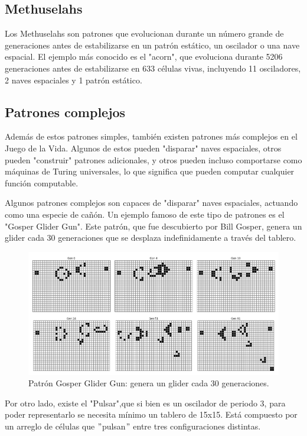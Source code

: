 \documentclass[]{article}
\begin{document}
\subsection{Methuselahs}
Los Methuselahs son patrones que evolucionan durante un número grande de generaciones antes de estabilizarse en un patrón estático, un oscilador o una nave espacial. El ejemplo más conocido es el "acorn", que evoluciona durante 5206 generaciones antes de estabilizarse en 633 células vivas, incluyendo 11 osciladores, 2 naves espaciales y 1 patrón estático.


\subsection{Patrones complejos}\label{sec:complejos}
Además de estos patrones simples, también existen patrones más complejos en el Juego de la Vida. Algunos de estos pueden "disparar" naves espaciales, otros pueden "construir" patrones adicionales, y otros pueden incluso comportarse como máquinas de Turing universales, lo que significa que pueden computar cualquier función computable.

Algunos patrones complejos son capaces de "disparar" naves espaciales, actuando como una especie de cañón. Un ejemplo famoso de este tipo de patrones es el "Gosper Glider Gun". Este patrón, que fue descubierto por Bill Gosper, genera un glider cada 30 generaciones que se desplaza indefinidamente a través del tablero.

\begin{figure}[H]
  \centering
 \includegraphics[width=1\textwidth]{../assets/space_ships/gosper_glider_gun/gosper_glider_gun.png}
  \caption{Patrón Gosper Glider Gun: genera un glider cada 30 generaciones.}
  \label{fig:gosper_glider_gun}
\end{figure}

Por otro lado, existe el "Pulsar",que si bien es un oscilador de periodo 3, para poder representarlo se necesita mínimo un tablero de 15x15. Está compuesto por un arreglo de células que $"$pulsan$"$ entre tres configuraciones distintas.
\end{document}
